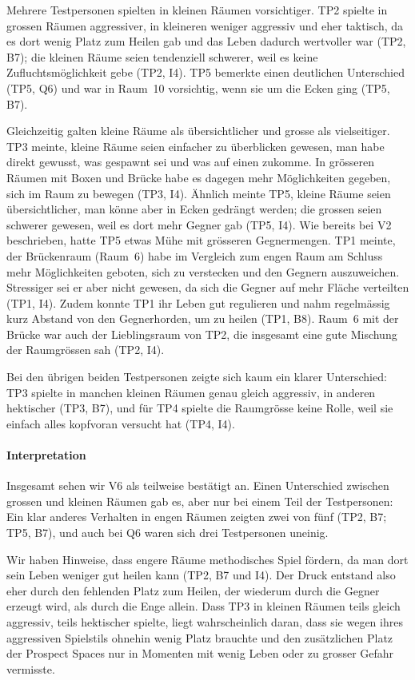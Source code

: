 \documentclass[../Main.tex]{subfiles}
\begin{document}
Mehrere Testpersonen spielten in kleinen Räumen vorsichtiger. TP2 spielte in grossen Räumen aggressiver, in kleineren weniger aggressiv und eher taktisch, da es dort wenig Platz zum Heilen gab und das Leben dadurch wertvoller war (TP2, B7); die kleinen Räume seien tendenziell schwerer, weil es keine Zufluchtsmöglichkeit gebe (TP2, I4). TP5 bemerkte einen deutlichen Unterschied (TP5, Q6) und war in Raum~10 vorsichtig, wenn sie um die Ecken ging (TP5, B7).

Gleichzeitig galten kleine Räume als übersichtlicher und grosse als vielseitiger. TP3 meinte, kleine Räume seien einfacher zu überblicken gewesen, man habe direkt gewusst, was gespawnt sei und was auf einen zukomme. In grösseren Räumen mit Boxen und Brücke habe es dagegen mehr Möglichkeiten gegeben, sich im Raum zu bewegen (TP3, I4). Ähnlich meinte TP5, kleine Räume seien übersichtlicher, man könne aber in Ecken gedrängt werden; die grossen seien schwerer gewesen, weil es dort mehr Gegner gab (TP5, I4). Wie bereits bei V2 beschrieben, hatte TP5 etwas Mühe mit grösseren Gegnermengen. TP1 meinte, der Brückenraum (Raum~6) habe im Vergleich zum engen Raum am Schluss mehr Möglichkeiten geboten, sich zu verstecken und den Gegnern auszuweichen. Stressiger sei er aber nicht gewesen, da sich die Gegner auf mehr Fläche verteilten (TP1, I4). Zudem konnte TP1 ihr Leben gut regulieren und nahm regelmässig kurz Abstand von den Gegnerhorden, um zu heilen (TP1, B8). Raum~6 mit der Brücke war auch der Lieblingsraum von TP2, die insgesamt eine gute Mischung der Raumgrössen sah (TP2, I4).

Bei den übrigen beiden Testpersonen zeigte sich kaum ein klarer Unterschied: TP3 spielte in manchen kleinen Räumen genau gleich aggressiv, in anderen hektischer (TP3, B7), und für TP4 spielte die Raumgrösse keine Rolle, weil sie einfach alles kopfvoran versucht hat (TP4, I4).

\paragraph{Interpretation}
Insgesamt sehen wir V6 als teilweise bestätigt an. Einen Unterschied zwischen grossen und kleinen Räumen gab es, aber nur bei einem Teil der Testpersonen: Ein klar anderes Verhalten in engen Räumen zeigten zwei von fünf (TP2, B7; TP5, B7), und auch bei Q6 waren sich drei Testpersonen uneinig.

Wir haben Hinweise, dass engere Räume methodisches Spiel fördern, da man dort sein Leben weniger gut heilen kann (TP2, B7 und I4). Der Druck entstand also eher durch den fehlenden Platz zum Heilen, der wiederum durch die Gegner erzeugt wird, als durch die Enge allein. Dass TP3 in kleinen Räumen teils gleich aggressiv, teils hektischer spielte, liegt wahrscheinlich daran, dass sie wegen ihres aggressiven Spielstils ohnehin wenig Platz brauchte und den zusätzlichen Platz der Prospect Spaces nur in Momenten mit wenig Leben oder zu grosser Gefahr vermisste.
\end{document}
